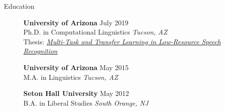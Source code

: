 \documentclass{resume} %
\begin{document}
\vspace{.5cm}
\begin{rSection}{Education}

    \begin{figure}[H]
    \begin{minipage}{0.2\textwidth}
      \centering
      
    \end{minipage}
    \begin{minipage}{0.8\textwidth}
      {\bf University of Arizona} \hfill {July 2019} \\
      Ph.D. in Computational Linguistics \hfill {\em Tucson, AZ}\\
      Thesis: \href{http://jrmeyer.github.io/misc/MEYER_dissertation_2019.pdf}{\textit{Multi-Task and Transfer Learning in Low-Resource Speech Recognition}}
    \end{minipage}
    \end{figure}
    
  \begin{figure}[H]
    \begin{minipage}{0.2\textwidth}
      \centering
      
    \end{minipage}
    \begin{minipage}{0.8\textwidth}
{\bf University of Arizona} \hfill {May 2015} \\
M.A. in Linguistics \hfill {\em Tucson, AZ}
    \end{minipage}
  \end{figure}
  
  \begin{figure}[H]
    \begin{minipage}{0.2\textwidth}
      \centering
      
    \end{minipage}
    \begin{minipage}{0.8\textwidth}
{\bf Seton Hall University} \hfill {May 2012} \\
B.A. in Liberal Studies \hfill {\em South Orange, NJ}
    \end{minipage}
  \end{figure}



\end{rSection}
\end{document}
